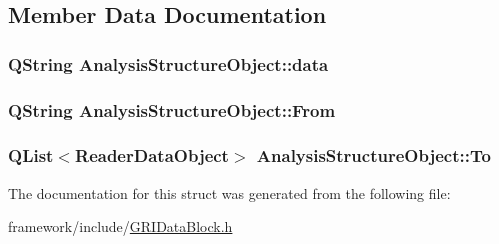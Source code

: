 \subsection{\-Member \-Data \-Documentation}
\hypertarget{structAnalysisStructureObject_a4388b9dbd88213d4b176927438045c26}{
\subsubsection[{data}]{\setlength{\rightskip}{0pt plus 5cm}\-Q\-String {\bf \-Analysis\-Structure\-Object\-::data}}}\label{structAnalysisStructureObject_a4388b9dbd88213d4b176927438045c26}
\hypertarget{structAnalysisStructureObject_ad289308454d692c259c6877aec9f5832}{
\subsubsection[{\-From}]{\setlength{\rightskip}{0pt plus 5cm}\-Q\-String {\bf \-Analysis\-Structure\-Object\-::\-From}}}\label{structAnalysisStructureObject_ad289308454d692c259c6877aec9f5832}
\hypertarget{structAnalysisStructureObject_a6b59b01dfd6487ea3ba391e5bdd5a033}{
\subsubsection[{\-To}]{\setlength{\rightskip}{0pt plus 5cm}\-Q\-List$<${\bf \-Reader\-Data\-Object}$>$ {\bf \-Analysis\-Structure\-Object\-::\-To}}}\label{structAnalysisStructureObject_a6b59b01dfd6487ea3ba391e5bdd5a033}


\-The documentation for this struct was generated from the following file\-:\begin{DoxyCompactItemize}
\item 
framework/include/\hyperlink{GRIDataBlock_8h}{\-G\-R\-I\-Data\-Block.\-h}\end{DoxyCompactItemize}

